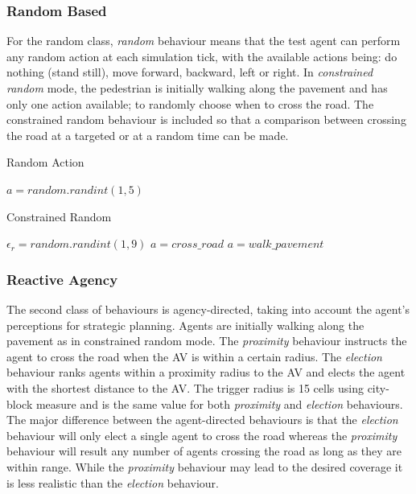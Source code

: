\documentclass[letterpaper, 10 pt, journal, twoside]{IEEEtran}
\begin{document}
\subsubsection{Random Based}
For the random class, \textit{random} behaviour means that the test agent can perform any random action at each simulation tick, with the available actions being: do nothing (stand still), move forward, backward, left or right. In \textit{constrained random} mode, the pedestrian is initially walking along the pavement and has only one action available; to randomly choose when to cross the road. The constrained random behaviour is included so that a comparison between crossing the road at a targeted or at a random time can be made. 

\begin{algorithm}
\caption{Random Action}\label{algo:rand}
\begin{algorithmic}[1]
\State $a = random.randint(1,5)$
\EndWhile
\end{algorithmic}
\end{algorithm}

\begin{algorithm}
\caption{Constrained Random}\label{algo:constRand}
\begin{algorithmic}[1]
\State $\epsilon_r = random.randint(1,9)$
    \State $a=cross\_road$
\Else
	\State $a=walk\_pavement$
\EndIf
\EndWhile
\end{algorithmic}
\end{algorithm}

\subsubsection{Reactive Agency}
The second class of behaviours is agency-directed, taking into account the agent's perceptions for strategic planning. Agents are initially walking along the pavement as in constrained random mode. The \textit{proximity} behaviour instructs the agent to cross the road when the AV is within a certain radius. The \textit{election} behaviour ranks agents within a proximity radius to the AV and elects the agent with the shortest distance to the AV. The trigger radius is 15 cells using city-block measure and is the same value for both \textit{proximity}  and \textit{election} behaviours. The major difference between the agent-directed behaviours is that the \textit{election} behaviour will only elect a single agent to cross the road whereas the \textit{proximity} behaviour will result any number of agents crossing the road as long as they are within range. While the \textit{proximity} behaviour may lead to the desired coverage it is less realistic than the \textit{election} behaviour. 
\end{document}
